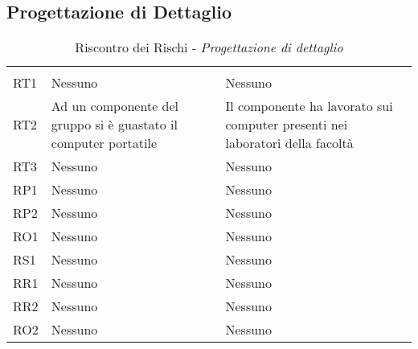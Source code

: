 \subsection{Progettazione di Dettaglio}
\label{sec:ProgettazioneDettaglioRischi}
\begin{table}[H]
	\centering
	\begin{tabular}{|C{2.5cm}|C{5cm}|C{5cm}|}
		 & & \\
		RT1  & Nessuno & Nessuno \\
		\hline
		RT2  & Ad un componente del gruppo si è guastato il computer portatile & Il componente ha lavorato sui computer presenti nei laboratori della facoltà \\
		\hline
		RT3  & Nessuno & Nessuno \\
		\hline
		RP1  & Nessuno & Nessuno \\
		\hline
		RP2  & Nessuno & Nessuno \\
		\hline
		RO1  & Nessuno & Nessuno \\
		\hline
		RS1  & Nessuno & Nessuno \\
		\hline
		RR1  & Nessuno & Nessuno \\
		\hline
		RR2  & Nessuno & Nessuno \\
		\hline
		RO2  & Nessuno & Nessuno \\
		\hline
	\end{tabular}
	\caption{Riscontro dei Rischi - \textit{Progettazione di dettaglio}}
\end{table}



